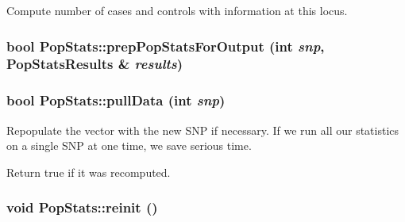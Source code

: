 \label{classPopStats_a41ed10737d6c1180b1f70ecd93576256}
Compute number of cases and controls with information at this locus. \hypertarget{classPopStats_a9e1f510002cc848f241ce4c2984ccfd1}{
\subsubsection[{prepPopStatsForOutput}]{\setlength{\rightskip}{0pt plus 5cm}bool PopStats::prepPopStatsForOutput (int {\em snp}, \/  {\bf PopStatsResults} \& {\em results})}}
\label{classPopStats_a9e1f510002cc848f241ce4c2984ccfd1}
\hypertarget{classPopStats_aa2ceb900a4674a55faf006776c7a7776}{
\subsubsection[{pullData}]{\setlength{\rightskip}{0pt plus 5cm}bool PopStats::pullData (int {\em snp})}}
\label{classPopStats_aa2ceb900a4674a55faf006776c7a7776}
Repopulate the vector with the new SNP if necessary. If we run all our statistics on a single SNP at one time, we save serious time.

Return true if it was recomputed. \hypertarget{classPopStats_ab4fb5cd7b7b44529e91fcd6bb6abb7d4}{
\subsubsection[{reinit}]{\setlength{\rightskip}{0pt plus 5cm}void PopStats::reinit ()}}
\label{classPopStats_ab4fb5cd7b7b44529e91fcd6bb6abb7d4}


